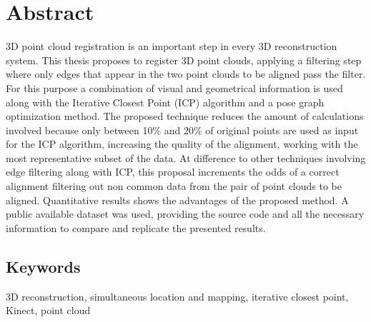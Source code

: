 
\chapter*{Abstract}

3D point cloud registration is an important step in every 3D reconstruction system. This thesis proposes to register 
3D point clouds, applying a filtering step where only edges that appear 
in the two point clouds to be aligned pass the filter. For this purpose a combination of visual and geometrical information is 
used along with the Iterative Closest Point (ICP)
  algorithm and a pose graph optimization method. The proposed technique reduces the amount of calculations 
involved because only between 10\% and 20\% of original points are used as input for the ICP algorithm, increasing 
the quality of the alignment, working with the most representative subset of the data. At difference to other techniques 
involving edge filtering along with ICP, this proposal increments the odds of a correct alignment filtering out non common 
data from the pair of point clouds to be aligned. Quantitative results shows the advantages of the proposed method. A 
public available dataset was used, 
providing the source 
code and all the necessary information to compare and replicate the presented results.

\section*{Keywords}

3D reconstruction, simultaneous location and mapping, iterative closest point, Kinect, point cloud
